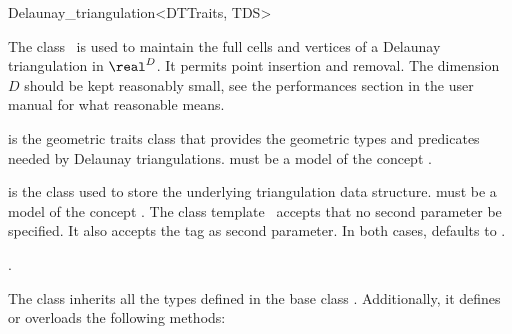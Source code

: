 \begin{ccRefClass}{Delaunay_triangulation<DTTraits, TDS>}

\ccDefinition

The class \ccRefName\ is used to maintain the full cells and vertices of a
Delaunay triangulation in $\real^D$. It permits point insertion and
removal. The dimension $D$ should be kept reasonably small,
see the performances section in the user manual for what reasonable
means.


\ccParameters

 is the geometric traits class that provides the geometric types
and predicates needed by Delaunay triangulations.  must be a model of
the concept .

 is the class used to store the underlying triangulation data
structure.  must be a model of the concept
. The class template \ccRefName\ accepts that no
second parameter be specified. It also accepts the tag  as
second parameter. In both cases,  defaults to
.


\ccInheritsFrom
{}.

The class  inherits all the types
defined in the base class . Additionally, it
defines or overloads the following methods:

\ccCreation %






\end{ccRefClass}
